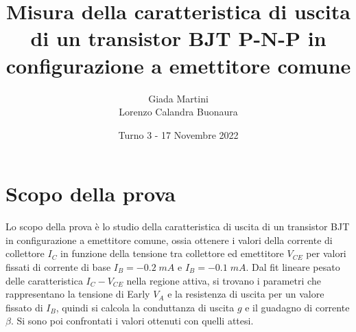 \documentclass[a4paper, 11pt]{article}
\title{\textbf{Misura della caratteristica di uscita di un transistor BJT P-N-P in configurazione a emettitore comune}}
\author{Giada Martini \\ Lorenzo Calandra Buonaura}
\date{Turno 3 - 17 Novembre 2022}
\begin{document}
\maketitle

\section{Scopo della prova}
Lo scopo della prova è lo studio della caratteristica di uscita di un transistor BJT in configurazione a emettitore comune, ossia ottenere i valori della corrente di collettore $I_C$ in funzione della tensione tra collettore ed emettitore $V_{CE}$  per valori fissati di corrente di base $I_B = -0.2 \; mA $ e $I_B = -0.1 \; mA$. Dal fit lineare pesato delle caratteristica $I_C-V_{CE}$ nella regione attiva, si trovano i parametri che rappresentano la tensione di Early $V_A$ e la resistenza di uscita per un valore fissato di $I_B$, quindi si calcola la conduttanza di uscita $g$ e il guadagno di corrente $\beta$. Si sono poi confrontati i valori ottenuti con quelli attesi.
\end{document}
